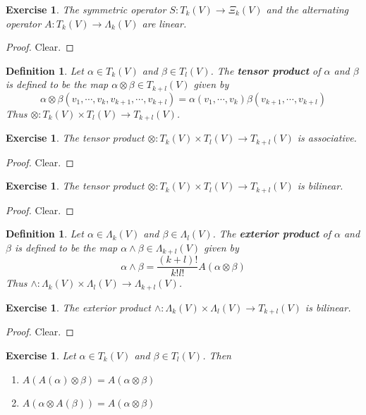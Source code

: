\documentclass[12pt]{amsart}
\newtheorem{defn}[thm]{Definition}
\newtheorem{ex}[thm]{Exercise}
\newcommand{\al}{\alpha}
\newcommand{\Lam}{\Lambda}
\begin{document}
	\begin{ex}
		The symmetric operator $S: T_k(V) \rightarrow \Xi_k(V)$ and the alternating operator $A: T_k(V) \rightarrow \Lam_k(V)$ are linear.
	\end{ex}

	\begin{proof}
		Clear.
	\end{proof}
	
	\begin{defn}
		Let $\al \in T_k(V)$ and $\beta \in T_l(V)$. The \textbf{tensor product} of $\al$ and $\beta$ is defined to be the map $\al \otimes \beta \in T_{k+l}(V)$ given by $$\al \otimes \beta (v_1, \cdots, v_k, v_{k+1}, \cdots, v_{k+l}) = \al(v_1, \cdots, v_k) \beta(v_{k+1}, \cdots, v_{k+l})$$  
		Thus $\otimes: T_k(V) \times T_l(V) \rightarrow T_{k+l}(V)$.
	\end{defn}

	\begin{ex}
		The tensor product $\otimes: T_k(V) \times T_l(V) \rightarrow T_{k+l}(V)$ is associative.
	\end{ex}

	\begin{proof}
		Clear.
	\end{proof}
	
	\begin{ex}
		The tensor product $\otimes: T_k(V) \times T_l(V) \rightarrow T_{k+l}(V)$ is bilinear.
	\end{ex}

	\begin{proof}
		Clear.
	\end{proof}
	
	\begin{defn}
		Let $\al \in \Lam_k(V)$ and $\beta \in \Lam_l(V)$. The \textbf{exterior product} of $\al$ and $\beta$ is defined to be the map $\al \wedge \beta \in \Lam_{k+l}(V)$ given by $$\al \wedge \beta = \frac{(k+l)!}{k! l!} A(\al \otimes \beta)$$ 
		Thus $\wedge: \Lam_k(V) \times \Lam_l(V) \rightarrow \Lam_{k+l}(V)$.
	\end{defn}

	\begin{ex}
		The exterior product $\wedge: \Lam_k(V) \times \Lam_l(V) \rightarrow T_{k+l}(V)$ is bilinear.
	\end{ex}
	
	\begin{proof}
		Clear.
	\end{proof}

	\begin{ex}
		Let $\al \in T_k(V)$ and $\beta \in T_l(V)$. Then 
		\begin{enumerate}
			\item $A(A(\al) \otimes \beta) = A(\al \otimes \beta)$
			\item $A(\al \otimes A(\beta)) = A(\al \otimes \beta)$
		\end{enumerate}
	\end{ex}
\end{document}
